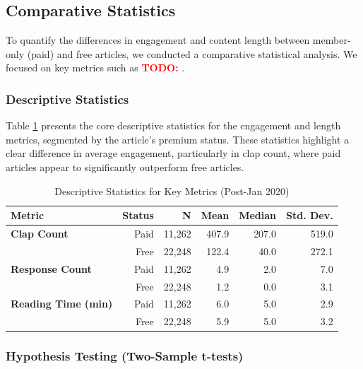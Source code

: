 \documentclass[11pt,a4paper]{article}
\newcommand{\todo}[1]{\textcolor{red}{\textbf{TODO:} #1}}
\begin{document}
\subsection{Comparative Statistics}

To quantify the differences in engagement and content length between member-only (paid) and free articles, we conducted a comparative statistical analysis. We focused on key metrics such as \todo{}.

\subsubsection{Descriptive Statistics}

Table \ref{tab:descriptive_stats} presents the core descriptive statistics for the engagement and length metrics, segmented by the article's premium status. These statistics highlight a clear difference in average engagement, particularly in clap count, where paid articles appear to significantly outperform free articles.

\begin{table}[H]
    \centering
    \caption{Descriptive Statistics for Key Metrics (Post-Jan 2020)}
    \label{tab:descriptive_stats}
    \begin{tabular}{lrrrrr}
        \toprule
        \textbf{Metric} & \textbf{Status} & \textbf{N} & \textbf{Mean} & \textbf{Median} & \textbf{Std. Dev.} \\
        \midrule
        \textbf{Clap Count} & Paid & 11,262 & 407.9 & 207.0 & 519.0 \\
        & Free & 22,248 & 122.4 & 40.0 & 272.1 \\
        \midrule
        \textbf{Response Count} & Paid & 11,262 & 4.9 & 2.0 & 7.0 \\
        & Free & 22,248 & 1.2 & 0.0 & 3.1 \\
        \midrule
        \textbf{Reading Time (min)} & Paid & 11,262 & 6.0 & 5.0 & 2.9 \\
        & Free & 22,248 & 5.9 & 5.0 & 3.2 \\
        \bottomrule
    \end{tabular}
    \vspace{0.5em}
\end{table}

\subsubsection{Hypothesis Testing (Two-Sample t-tests)}
\end{document}
